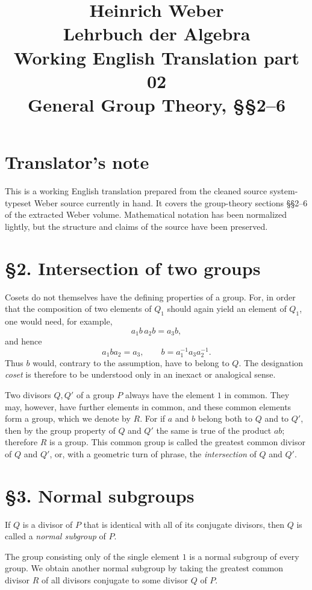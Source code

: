 \documentclass[11pt]{article}
\title{Heinrich Weber\\Lehrbuch der Algebra\\Working English Translation part 02\\General Group Theory, §§2--6}
\author{}
\date{}
\begin{document}
\maketitle

\section*{Translator's note}
This is a working English translation prepared from the cleaned source system-typeset Weber source currently in hand. It covers the group-theory sections §§2--6 of the extracted Weber volume. Mathematical notation has been normalized lightly, but the structure and claims of the source have been preserved.

\section*{§2. Intersection of two groups}
Cosets do not themselves have the defining properties of a group. For, in order that the composition of two elements of $Q_1$ should again yield an element of $Q_1$, one would need, for example,
\[
 a_1 b\, a_2 b = a_3 b,
\]
and hence
\[
 a_1 b a_2 = a_3,
 \qquad
 b = a_1^{-1} a_3 a_2^{-1}.
\]
Thus $b$ would, contrary to the assumption, have to belong to $Q$. The designation \emph{coset} is therefore to be understood only in an inexact or analogical sense.

Two divisors $Q,Q'$ of a group $P$ always have the element $1$ in common. They may, however, have further elements in common, and these common elements form a group, which we denote by $R$. For if $a$ and $b$ belong both to $Q$ and to $Q'$, then by the group property of $Q$ and $Q'$ the same is true of the product $ab$; therefore $R$ is a group. This common group is called the greatest common divisor of $Q$ and $Q'$, or, with a geometric turn of phrase, the \emph{intersection} of $Q$ and $Q'$.

\section*{§3. Normal subgroups}
If $Q$ is a divisor of $P$ that is identical with all of its conjugate divisors, then $Q$ is called a \emph{normal subgroup} of $P$.

The group consisting only of the single element $1$ is a normal subgroup of every group. We obtain another normal subgroup by taking the greatest common divisor $R$ of all divisors conjugate to some divisor $Q$ of $P$.
\end{document}
